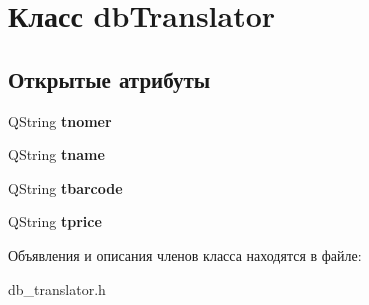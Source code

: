 \hypertarget{classdb_translator}{\section{Класс db\-Translator}
\label{classdb_translator}
}
\subsection*{Открытые атрибуты}
\begin{DoxyCompactItemize}
\item 
\hypertarget{classdb_translator_a35e990e643c58a86cbf4740f73fb6f20}{\-Q\-String {\bfseries tnomer}}\label{classdb_translator_a35e990e643c58a86cbf4740f73fb6f20}

\item 
\hypertarget{classdb_translator_af3da0f148d1c96186f7a729992ae6aed}{\-Q\-String {\bfseries tname}}\label{classdb_translator_af3da0f148d1c96186f7a729992ae6aed}

\item 
\hypertarget{classdb_translator_a8b3ec24ea694212a4e209fc25fecc5ad}{\-Q\-String {\bfseries tbarcode}}\label{classdb_translator_a8b3ec24ea694212a4e209fc25fecc5ad}

\item 
\hypertarget{classdb_translator_a2cdaf4360199fdd7902a19d694eb1840}{\-Q\-String {\bfseries tprice}}\label{classdb_translator_a2cdaf4360199fdd7902a19d694eb1840}

\end{DoxyCompactItemize}


Объявления и описания членов класса находятся в файле\-:\begin{DoxyCompactItemize}
\item 
db\-\_\-translator.\-h\end{DoxyCompactItemize}
